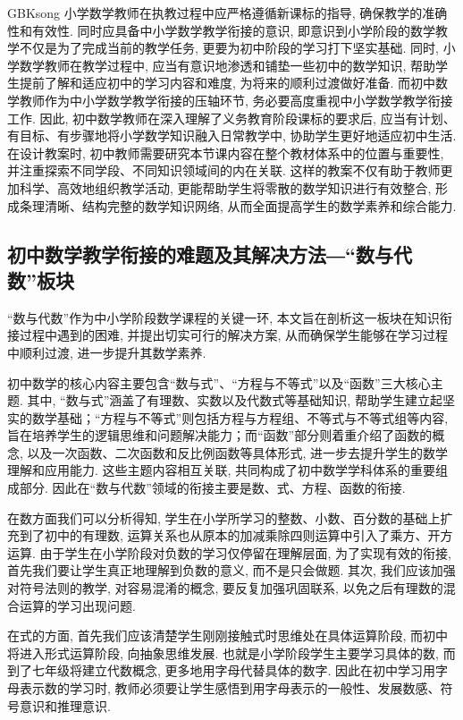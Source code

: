 \documentclass[a4paper,12pt,twoside]{ctexart}
\begin{document}
\begin{CJK*}{GBK}{song}
小学数学教师在执教过程中应严格遵循新课标的指导, 确保教学的准确性和有效性. 同时应具备中小学数学教学衔接的意识, 即意识到小学阶段的数学教学不仅是为了完成当前的教学任务, 更要为初中阶段的学习打下坚实基础. 同时,  小学数学教师在教学过程中, 应当有意识地渗透和铺垫一些初中的数学知识, 帮助学生提前了解和适应初中的学习内容和难度, 为将来的顺利过渡做好准备.
而初中数学教师作为中小学数学教学衔接的压轴环节, 务必要高度重视中小学数学教学衔接工作. 因此, 初中数学教师在深入理解了义务教育阶段课标的要求后, 应当有计划、有目标、有步骤地将小学数学知识融入日常教学中, 协助学生更好地适应初中生活. 在设计教案时, 初中教师需要研究本节课内容在整个教材体系中的位置与重要性, 并注重探索不同学段、不同知识领域间的内在关联. 这样的教案不仅有助于教师更加科学、高效地组织教学活动, 更能帮助学生将零散的数学知识进行有效整合, 形成条理清晰、结构完整的数学知识网络, 从而全面提高学生的数学素养和综合能力.
\subsection{初中数学教学衔接的难题及其解决方法―“数与代数”板块}
“数与代数”作为中小学阶段数学课程的关键一环, 本文旨在剖析这一板块在知识衔接过程中遇到的困难, 并提出切实可行的解决方案, 从而确保学生能够在学习过程中顺利过渡, 进一步提升其数学素养.

初中数学的核心内容主要包含“数与式”、“方程与不等式”以及“函数”三大核心主题. 其中, “数与式”涵盖了有理数、实数以及代数式等基础知识, 帮助学生建立起坚实的数学基础；“方程与不等式”则包括方程与方程组、不等式与不等式组等内容, 旨在培养学生的逻辑思维和问题解决能力；而“函数”部分则着重介绍了函数的概念, 以及一次函数、二次函数和反比例函数等具体形式, 进一步去提升学生的数学理解和应用能力. 这些主题内容相互关联, 共同构成了初中数学学科体系的重要组成部分. 因此在“数与代数”领域的衔接主要是数、式、方程、函数的衔接.

在数方面我们可以分析得知, 学生在小学所学习的整数、小数、百分数的基础上扩充到了初中的有理数, 运算关系也从原本的加减乘除四则运算中引入了乘方、开方运算. 由于学生在小学阶段对负数的学习仅停留在理解层面, 为了实现有效的衔接, 首先我们要让学生真正地理解到负数的意义, 而不是只会做题. 其次, 我们应该加强对符号法则的教学, 对容易混淆的概念, 要反复加强巩固联系, 以免之后有理数的混合运算的学习出现问题.

在式的方面, 首先我们应该清楚学生刚刚接触式时思维处在具体运算阶段, 而初中将进入形式运算阶段, 向抽象思维发展. 也就是小学阶段学生主要学习具体的数, 而到了七年级将建立代数概念, 更多地用字母代替具体的数字. 因此在初中学习用字母表示数的学习时, 教师必须要让学生感悟到用字母表示的一般性、发展数感、符号意识和推理意识.


\end{CJK*}
\end{document}
